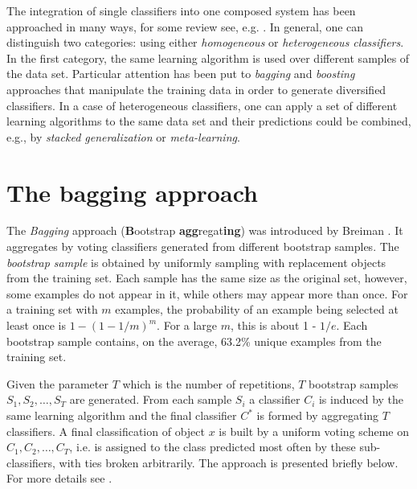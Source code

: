 \documentclass{llncs}
\begin{document}
The integration of single classifiers into one composed system has been
approached in many ways, for some review see, e.g.
\cite{Dietrich,Gama,Stef01,habcia}. In general, one can distinguish two
categories: using either {\em homogeneous} or {\em heterogeneous
classifiers}. In the first category, the same learning algorithm is used
over different samples of the data set. Particular attention has been put to
\emph{bagging}  and \emph{boosting} approaches that manipulate the training
data in order to generate diversified classifiers. In a case of
heterogeneous classifiers, one can apply a set of different learning
algorithms to the same data set and their predictions could be combined,
e.g., by \emph{stacked generalization} or \emph{meta-learning}.

\section{The bagging approach}

The {\em Bagging} approach ({\bf B}ootstrap {\bf agg}regat{\bf ing}) was
introduced by Breiman \cite{Bre}. It aggregates by voting classifiers
generated from different bootstrap samples. The {\it bootstrap sample} is
obtained by uniformly sampling with replacement objects from the training
set. Each sample has the same size as the original set, however, some
examples do not appear in it, while others may appear more than once. For a
training set with $m$ examples, the probability of an example being selected
at least once is $1 -(1 - 1/m)^m$. For a large $m$, this is about 1 - $1/e$.
Each bootstrap sample contains, on the average, 63.2\% unique examples from
the training set.

Given the parameter $T$ which is the number of repetitions, $T$
bootstrap samples $S_1, S_2,\ldots ,S_T$ are generated. From each
sample $S_i$ a classifier $C_i$ is induced by the same learning
algorithm and the final classifier $C^*$ is formed by aggregating
$T$ classifiers. A final classification of object $x$ is built by
a uniform voting scheme on $C_1,C_2,\ldots,C_T$, i.e. is assigned
to the class predicted most often by these sub-classifiers, with
ties broken arbitrarily. The approach is presented briefly below.
For more details see \cite{Bre}.

\newenvironment{algo}{\newcommand{\B}{{\bf begin}}
\newcommand{\DO}{{\bf do}~} \newcommand{\E}{{\bf end}}
\newcommand{\FOR}{{\bf for}~} \newcommand{\IF}{{\bf if}~}
\newcommand{\THEN}{{\bf then}~}
\newcommand{\ELSE}{{\bf else}~}
\newcommand{\WHILE}{{\bf while}~}
\newcommand{\TO}{{\bf to}~}
\small
\begin{tabbing}
99999\= 999\= 999\= 999\= 999\= 999\= \+ \+ \kill}{\end{tabbing}
\normalsize}
\end{document}
